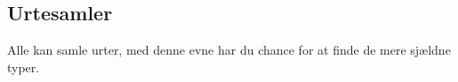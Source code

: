 \subsection*{Urtesamler}
Alle kan samle urter, med denne evne har du chance for at finde de mere sjældne typer.